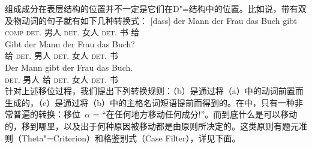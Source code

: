 组成成分在表层结构的位置并不一定是它们在D"=结构中的位置。比如说，带有双及物动词的句子就有如下几种转换式：
\eal
\ex 
\gll {}[dass] der Mann der Frau das Buch gibt\\
	 {}\spacebr{}\textsc{comp} \textsc{det}.\nom{}  男人 \textsc{det}.\dat{} 女人 \textsc{det}.\acc{} 书 给\\
\ex 
\gll Gibt der Mann der Frau das Buch?\\
	 给 \textsc{det}.\nom{} 男人 \textsc{det}.\dat{} 女人 \textsc{det}.\acc{} 书\\
\ex 
\gll Der Mann gibt der Frau das Buch.\\
	 \textsc{det}.\nom{} 男人 给 \textsc{det}.\dat{} 女人 \textsc{det}.\acc{} 书\\
\zl
针对上述移位过程，我们提出下列转换规则：（b）是通过将（a）中的动词前置而生成的，（c）是通过将（b）中的主格名词短语提前而得到的。在\gbtc 中，只有一种非常普遍的转换：移位~$\alpha$ = “在任何地方移动任何成分!”。而到底什么是可以移动的，移到哪里，以及出于何种原因被移动都是由原则所决定的。这类原则有题元准则（Theta"=Criterion）和格鉴别式（Case Filter），详见下面。

